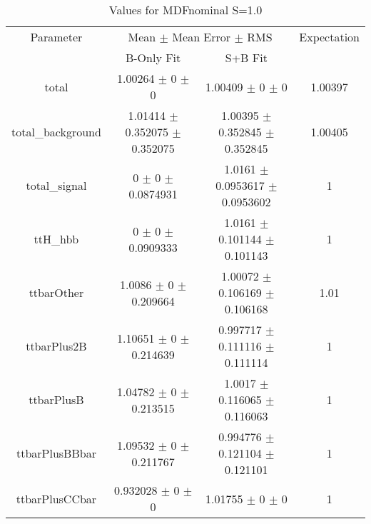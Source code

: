 \begin{table}
\centering
\caption{Values for MDFnominal S=1.0}
\begin{tabular}{cccc}
\toprule
Parameter & \multicolumn{2}{c}{Mean $\pm$ Mean Error $\pm$ RMS} & Expectation\\
 & B-Only Fit & S+B Fit & \\
\midrule
total & \num{1.00264} $\pm$ \num{0} $\pm$ \num{0} & \num{1.00409} $\pm$ \num{0} $\pm$ \num{0} & \num{1.00397}\\
total\_background & \num{1.01414} $\pm$ \num{0.352075} $\pm$ \num{0.352075} & \num{1.00395} $\pm$ \num{0.352845} $\pm$ \num{0.352845} & \num{1.00405}\\
total\_signal & \num{0} $\pm$ \num{0} $\pm$ \num{0.0874931} & \num{1.0161} $\pm$ \num{0.0953617} $\pm$ \num{0.0953602} & \num{1}\\
ttH\_hbb & \num{0} $\pm$ \num{0} $\pm$ \num{0.0909333} & \num{1.0161} $\pm$ \num{0.101144} $\pm$ \num{0.101143} & \num{1}\\
ttbarOther & \num{1.0086} $\pm$ \num{0} $\pm$ \num{0.209664} & \num{1.00072} $\pm$ \num{0.106169} $\pm$ \num{0.106168} & \num{1.01}\\
ttbarPlus2B & \num{1.10651} $\pm$ \num{0} $\pm$ \num{0.214639} & \num{0.997717} $\pm$ \num{0.111116} $\pm$ \num{0.111114} & \num{1}\\
ttbarPlusB & \num{1.04782} $\pm$ \num{0} $\pm$ \num{0.213515} & \num{1.0017} $\pm$ \num{0.116065} $\pm$ \num{0.116063} & \num{1}\\
ttbarPlusBBbar & \num{1.09532} $\pm$ \num{0} $\pm$ \num{0.211767} & \num{0.994776} $\pm$ \num{0.121104} $\pm$ \num{0.121101} & \num{1}\\
ttbarPlusCCbar & \num{0.932028} $\pm$ \num{0} $\pm$ \num{0} & \num{1.01755} $\pm$ \num{0} $\pm$ \num{0} & \num{1}\\
\bottomrule
\end{tabular}
\end{table}